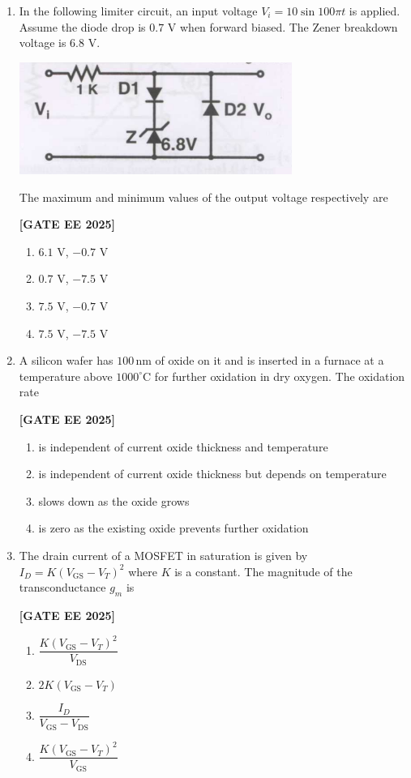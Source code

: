 \documentclass[12pt]{article}
\begin{document}
\begin{enumerate}[leftmargin=2.5em, label=\textbf{Q.\arabic*}., itemsep=2em]
\item In the following limiter circuit, an input voltage $V_i=10\sin100\pi t$ is applied. Assume the diode drop is $0.7$ V when forward biased. The Zener breakdown voltage is $6.8$ V.
\begin{center}
\includegraphics[width=0.7\textwidth]{figs/q17.png}
\end{center}

The maximum and minimum values of the output voltage respectively are
 
\noindent \textbf{[GATE EE 2025]}
\begin{enumerate}[label=(\Alph*)]
  \item $6.1$ V, $-0.7$ V
  \item $0.7$ V, $-7.5$ V
  \item $7.5$ V, $-0.7$ V
  \item $7.5$ V, $-7.5$ V
\end{enumerate}

\item A silicon wafer has $100\,\mathrm{nm}$ of oxide on it and is inserted in a furnace at a temperature above $1000^\circ$C for further oxidation in dry oxygen. The oxidation rate
 
\noindent \textbf{[GATE EE 2025]}
\begin{enumerate}[label=(\Alph*)]
  \item is independent of current oxide thickness and temperature
  \item is independent of current oxide thickness but depends on temperature
  \item slows down as the oxide grows
  \item is zero as the existing oxide prevents further oxidation
\end{enumerate}

\item The drain current of a MOSFET in saturation is given by $I_D=K(V_{\mathrm{GS}}-V_T)^2$ where $K$ is a constant.
The magnitude of the transconductance $g_m$ is
 
\noindent \textbf{[GATE EE 2025]}
\begin{enumerate}[label=(\Alph*)]
  \item $\dfrac{K(V_{\mathrm{GS}}-V_T)^2}{V_{\mathrm{DS}}}$
  \item $2K(V_{\mathrm{GS}}-V_T)$
  \item $\dfrac{I_D}{V_{\mathrm{GS}}-V_{\mathrm{DS}}}$
  \item $\dfrac{K(V_{\mathrm{GS}}-V_T)^2}{V_{\mathrm{GS}}}$
\end{enumerate}


\end{enumerate}
\end{document}
